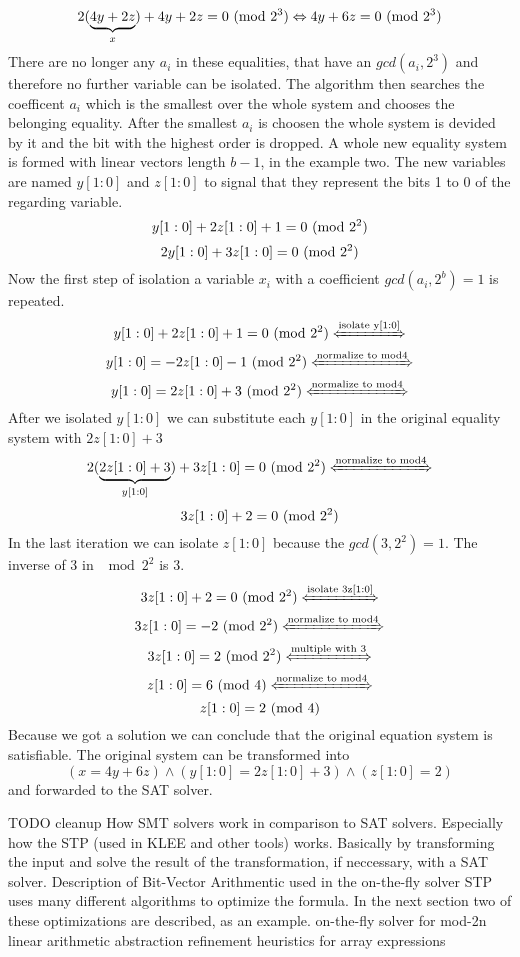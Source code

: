 $$2(\underbrace{4y+2z}_{x})+ 4y + 2z = 0 \ (\mathrm{mod}\ 2^3) \Leftrightarrow 4y + 6z = 0\ (\mathrm{mod}\ 2^3) $$
There are no longer any ${a_i}$ in these equalities, that have an $gcd(a_i,2^3)$ and therefore no further variable can be isolated.
The algorithm then searches the coefficent $a_i$ which is the smallest over the whole system and chooses the belonging equality.
After the smallest $a_i$ is choosen the whole system is devided by it and the bit with the highest order is dropped.
A whole new equality system is formed with linear vectors length $b-1$, in the example two.
The new variables are named $y[1:0]$ and $z[1:0]$ to signal that they represent the bits 1 to 0 of the regarding variable.
$$y[1 : 0] + 2z[1 : 0] + 1 = 0 \ (\mathrm{mod}\ 2^2)$$
$$2y[1 : 0] + 3z[1 : 0] = 0\ (\mathrm{mod}\ 2^2)$$
Now the first step of isolation a variable $x_i$ with a coefficient $gcd(a_i, 2^b)=1$ is repeated.
$$y[1 : 0] + 2z[1 : 0] + 1 = 0 \Mod{2^2} \xleftrightarrow{\text{isolate y[1:0]}}$$
$$y[1 : 0] = -2z[1 : 0] -1 \Mod{2^2} \xleftrightarrow{\text{normalize to mod4}}$$
$$y[1 : 0] = 2z[1 : 0] +3 \Mod{2^2} \xleftrightarrow{\text{normalize to mod4}}$$
After we isolated $y[1 : 0] $ we can substitute each $y[1 : 0] $ in the original equality system with $2z[1:0]+3$
$$2(\underbrace{2z[1:0]+3}_{y[1:0]}) + 3z[1 : 0] = 0\Mod{2^2} \xleftrightarrow{\text{normalize to mod4}}$$
$$3z[1:0] + 2 = 0 \ (\mathrm{mod}\ 2^2)$$
In the last iteration we can isolate $z[1:0]$ because the $gcd(3,2^2) = 1$. The inverse of 3 in $\mod{2^2}$ is 3.
$$3z[1:0] + 2 = 0 \Mod{2^2} \xleftrightarrow{\text{isolate 3z[1:0]}}$$
$$3z[1:0]=-2  \Mod{2^2}   \xleftrightarrow{\text{normalize to mod4}}$$
$$3z[1:0]=2  \Mod{2^2}   \xleftrightarrow{\text{multiple with 3}}$$
$$z[1:0]=6  \Mod{4}  \xleftrightarrow{\text{normalize to mod4}}$$
$$z[1:0]=2  \ (\mathrm{mod}\ 4)$$
Because we got a solution we can conclude that the original equation system is satisfiable.
The original system can be transformed into $$(x = 4y + 6z) \land (y[1 : 0] = 2z[1 : 0] + 3) \land (z[1 : 0] = 2)$$ and forwarded to the SAT solver.

TODO cleanup
How SMT solvers work in comparison to SAT solvers.
Especially how the STP \cite{Ganesh:2007:DPB:1770351.1770421} (used in KLEE and other tools) works.
Basically by transforming the input and solve the result of the transformation, if neccessary, with a SAT solver.
Description of Bit-Vector Arithmentic used in the on-the-fly solver\cite{10.1007/978-3-540-71209-1_28}
STP uses many different algorithms to optimize the formula. In the next section two of these optimizations are described, as an example.
on-the-fly solver for mod-2n linear arithmetic
abstraction refinement heuristics for array expressions 